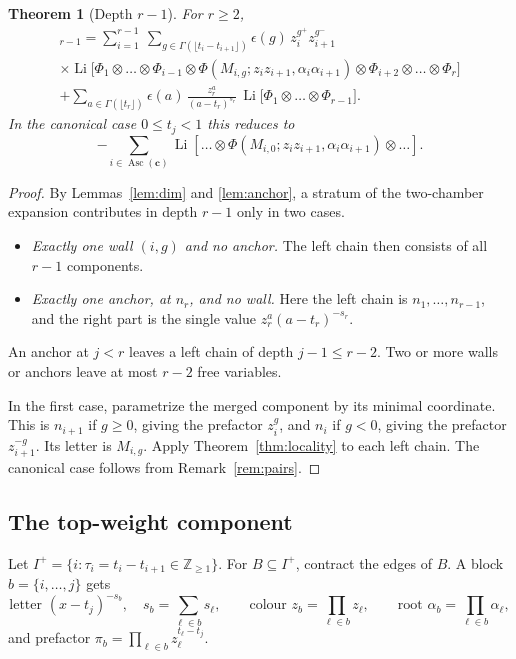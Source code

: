 \documentclass[11pt]{amsart}
\newtheorem{theorem}{Theorem}[section]
\theoremstyle{definition}
\theoremstyle{remark}
\numberwithin{equation}{section}
\newcommand{\Z}{\mathbb{Z}}
\newcommand{\Li}{\operatorname{Li}}
\newcommand{\cS}{\mathcal{S}}
\newcommand{\Asc}{\operatorname{Asc}}
\newcommand{\s}{\mathbf{s}}
\newcommand{\z}{\mathbf{z}}
\newcommand{\tb}{\mathbf{t}}
\newcommand{\cb}{\mathbf{c}}
\newcommand{\Hs}{\mathcal{H}}
\newcommand{\lfl}{\lfloor}
\newcommand{\rfl}{\rfloor}
\begin{document}
\begin{theorem}[Depth $r-1$]\label{thm:depthrm1}
For $r\ge2$,
\begin{multline*}
[\cS(\Hs_\s(\z;\tb))]_{r-1}=\sum_{i=1}^{r-1}\ \sum_{g\in\Gamma(\lfl t_i-t_{i+1}\rfl)}\epsilon(g)\,z_i^{g^+}z_{i+1}^{g^-}\\
\times\Li\big[\Phi_1\otimes\dots\otimes\Phi_{i-1}\otimes\Phi(M_{i,g};z_iz_{i+1},\alpha_i\alpha_{i+1})\otimes\Phi_{i+2}\otimes\dots\otimes\Phi_r\big]\\
+\sum_{a\in\Gamma(\lfl t_r\rfl)}\epsilon(a)\,\frac{z_r^{a}}{(a-t_r)^{s_r}}\,\Li\big[\Phi_1\otimes\dots\otimes\Phi_{r-1}\big].
\end{multline*}
In the canonical case $0\le t_j<1$ this reduces to
\[
-\sum_{i\in\Asc(\cb)}\Li[\dots\otimes\Phi(M_{i,0};z_iz_{i+1},\alpha_i\alpha_{i+1})\otimes\dots].
\]
\end{theorem}
\begin{proof}
By Lemmas~\ref{lem:dim} and \ref{lem:anchor}, a stratum of the two-chamber expansion contributes in depth $r-1$ only in two cases.
\begin{itemize}[leftmargin=1.5em]
\item \emph{Exactly one wall $(i,g)$ and no anchor.} The left chain then consists of all $r-1$ components.
\item \emph{Exactly one anchor, at $n_r$, and no wall.} Here the left chain is $n_1,\dots,n_{r-1}$, and the right part is the single value $z_r^a(a-t_r)^{-s_r}$.
\end{itemize}
An anchor at $j<r$ leaves a left chain of depth $j-1\le r-2$. Two or more walls or anchors leave at most $r-2$ free variables.

In the first case, parametrize the merged component by its minimal coordinate. This is $n_{i+1}$ if $g\ge0$, giving the prefactor $z_i^{g}$, and $n_i$ if $g<0$, giving the prefactor $z_{i+1}^{-g}$. Its letter is $M_{i,g}$. Apply Theorem~\ref{thm:locality} to each left chain. The canonical case follows from Remark~\ref{rem:pairs}.
\end{proof}

\subsection{The top-weight component}
Let $I^+=\{i:\tau_i=t_i-t_{i+1}\in\Z_{\ge1}\}$. For $B\subseteq I^+$, contract the edges of $B$. A block $b=\{i,\dots,j\}$ gets
\[
\text{letter }(x-t_j)^{-s_b},\quad s_b=\sum_{\ell\in b}s_\ell,\qquad \text{colour } z_b=\prod_{\ell\in b}z_\ell,\qquad \text{root }\alpha_b=\prod_{\ell\in b}\alpha_\ell,
\]
and prefactor $\pi_b=\prod_{\ell\in b}z_\ell^{t_\ell-t_j}$.
\end{document}
